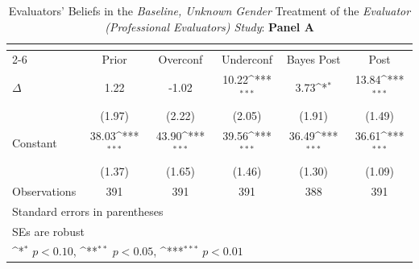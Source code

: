 \begin{table}[htbp]\centering
\def\sym#1{\ifmmode^{#1}\else\(^{#1}\)\fi}
\caption{Evaluators' Beliefs in the \textit{Baseline, Unknown Gender} Treatment of the \textit{Evaluator (Professional Evaluators) Study}: \textbf{Panel A}}
\begin{tabular}{l*{5}{c}}
\hline\hline
                &\multicolumn{5}{c}{}                                                                          \\\cmidrule(lr){2-6}
                &\multicolumn{1}{c}{Prior}&\multicolumn{1}{c}{Overconf}&\multicolumn{1}{c}{Underconf}&\multicolumn{1}{c}{Bayes Post}&\multicolumn{1}{c}{Post}\\
\hline
$\Delta$        &     1.22         &    -1.02         &    10.22\sym{***}&     3.73\sym{*}  &    13.84\sym{***}\\
                &   (1.97)         &   (2.22)         &   (2.05)         &   (1.91)         &   (1.49)         \\
Constant        &    38.03\sym{***}&    43.90\sym{***}&    39.56\sym{***}&    36.49\sym{***}&    36.61\sym{***}\\
                &   (1.37)         &   (1.65)         &   (1.46)         &   (1.30)         &   (1.09)         \\
\hline
Observations    &      391         &      391         &      391         &      388         &      391         \\
\hline\hline
\multicolumn{6}{l}{\footnotesize Standard errors in parentheses}\\
\multicolumn{6}{l}{\footnotesize SEs are robust}\\
\multicolumn{6}{l}{\footnotesize \sym{*} \(p<0.10\), \sym{**} \(p<0.05\), \sym{***} \(p<0.01\)}\\
\end{tabular}
\end{table}

